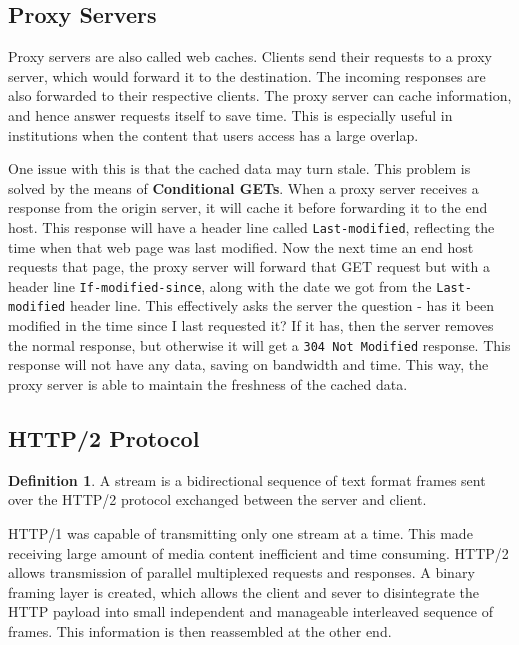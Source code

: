 \documentclass[12pt,letterpaper]{amsbook}
\theoremstyle{definition}
\newtheorem{definition}{Definition}[section] %
\begin{document}
\subsection{Proxy Servers}

Proxy servers are also called web caches. Clients send their requests to a proxy server, which would forward it to the destination. The incoming responses are also forwarded to their respective clients. The proxy server can cache information, and hence answer requests itself to save time. This is especially useful in institutions when the content that users access has a large overlap.

One issue with this is that the cached data may turn stale. This problem is solved by the means of \textbf{Conditional GETs}. When a proxy server receives a response from the origin server, it will cache it before forwarding it to the end host. This response will have a header line called \texttt{Last-modified}, reflecting the time when that web page was last modified. Now the next time an end host requests that page, the proxy server will forward that GET request but with a header line \texttt{If-modified-since}, along with the date we got from the \texttt{Last-modified} header line. This effectively asks the server the question - has it been modified in the time since I last requested it? If it has, then the server removes the normal response, but otherwise it will get a \texttt{304 Not Modified} response. This response will not have any data, saving on bandwidth and time. This way, the proxy server is able to maintain the freshness of the cached data.

\subsection{HTTP/2 Protocol}

\begin{definition}
  A stream is a bidirectional sequence of text format frames sent over the HTTP/2 protocol exchanged between the server and client.  
\end{definition}

HTTP/1 was capable of transmitting only one stream at a time. This made receiving large amount of media content inefficient and time consuming. HTTP/2 allows transmission of parallel multiplexed requests and responses. A binary framing layer is created, which allows the client and sever to disintegrate the HTTP payload into small independent and manageable interleaved sequence of frames. This information is then reassembled at the other end.
\end{document}

